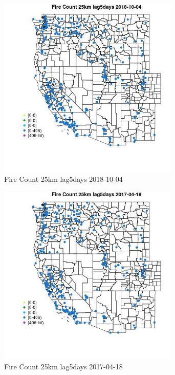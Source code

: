 \begin{figure} 
\centering  
\includegraphics[width=0.77\textwidth]{Code_Outputs/Report_ML_input_PM25_Step4_part_f_de_duplicated_aveswNAs_MapObsFire_Count_25km_lag5days2018-10-04.jpg} 
\caption{\label{fig:Report_ML_input_PM25_Step4_part_f_de_duplicated_aveswNAsMapObsFire_Count_25km_lag5days2018-10-04}Fire Count 25km lag5days 2018-10-04} 
\end{figure} 
 

\begin{figure} 
\centering  
\includegraphics[width=0.77\textwidth]{Code_Outputs/Report_ML_input_PM25_Step4_part_f_de_duplicated_aveswNAs_MapObsFire_Count_25km_lag5days2017-04-18.jpg} 
\caption{\label{fig:Report_ML_input_PM25_Step4_part_f_de_duplicated_aveswNAsMapObsFire_Count_25km_lag5days2017-04-18}Fire Count 25km lag5days 2017-04-18} 
\end{figure} 
 

